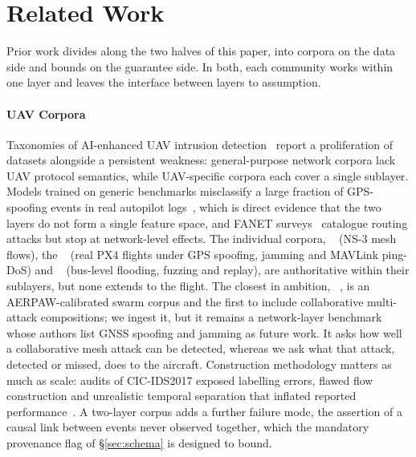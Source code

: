\section{Related Work}
\label{sec:related}
Prior work divides along the two halves of this paper, into corpora on the data
side and bounds on the guarantee side. In both, each community works within one
layer and leaves the interface between layers to assumption.

\paragraph{UAV Corpora}
Taxonomies of AI-enhanced UAV intrusion detection~\cite{islam2025uavids} report
a proliferation of datasets alongside a persistent weakness: general-purpose
network corpora lack UAV protocol semantics, while UAV-specific corpora each
cover a single sublayer. Models trained on generic benchmarks misclassify a
large fraction of GPS-spoofing events in real autopilot
logs~\cite{islam2025uavids}, which is direct evidence that the two layers do not
form a single feature space, and FANET
surveys~\cite{tsao2022survey,ceviz2024survey} catalogue routing attacks but stop
at network-level effects. The individual corpora, ~\cite{uavids2025}
(NS-3 mesh flows), the ~\cite{whelan2020uav,whelan2020novelty} (real PX4 flights under GPS
spoofing, jamming and MAVLink ping-DoS) and ~\cite{hcrl_uavcan} (bus-level flooding, fuzzing and replay), are
authoritative within their sublayers, but none extends to the flight. The
closest in ambition, ~\cite{uavcas2026}, is an
AERPAW-calibrated swarm corpus and the first to include collaborative
multi-attack compositions; we ingest it, but it remains a network-layer
benchmark whose authors list GNSS spoofing and jamming as future work. It asks
how well a collaborative mesh attack can be detected, whereas we ask what that
attack, detected or missed, does to the aircraft. Construction methodology
matters as much as scale: audits of CIC-IDS2017 exposed labelling errors,
flawed flow construction and unrealistic temporal separation that inflated
reported performance~\cite{engelen2021troubleshooting,sharafaldin2018cicids}. A
two-layer corpus adds a further failure mode, the assertion of a causal link
between events never observed together, which the mandatory provenance flag of
\S\ref{sec:schema} is designed to bound.

